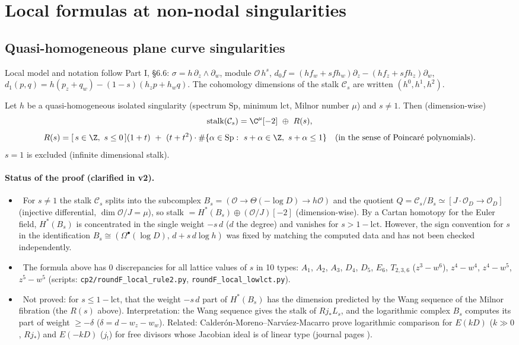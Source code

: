 \section{Local formulas at non-nodal singularities}\label{sec:local2}
\subsection{Quasi-homogeneous plane curve singularities}
Local model and notation follow Part I, \S6.6: $\sigma=h\,\partial_z\wedge\partial_w$, module $\mathcal O\,h^s$, $d_0f=(hf_w+sfh_w)\partial_z-(hf_z+sfh_z)\partial_w$, $d_1(p,q)=h(p_z+q_w)-(1-s)(h_zp+h_wq)$. The cohomology dimensions of the stalk $\mathcal C_s$ are written $(h^0,h^1,h^2)$.

\begin{obs}\label{obs:stalk}
Let $h$ be a quasi-homogeneous isolated singularity (spectrum $\mathrm{Sp}$, minimum $\mathrm{lct}$, Milnor number $\mu$) and $s\ne1$. Then (dimension-wise)
\[\text{stalk}(\mathcal C_s)=\C^{\mu}[-2]\ \oplus\ R(s),\]
\[R(s)=[\,s\in\Z,\ s\le0\,](1+t)\ +\ (t+t^2)\cdot\#\{\alpha\in\mathrm{Sp}:\ s+\alpha\in\Z,\ s+\alpha\le1\}\quad(\text{in the sense of Poincar\'e polynomials}).\]
$s=1$ is excluded (infinite dimensional stalk).
\end{obs}
\paragraph{Status of the proof (clarified in v2).}
\begin{itemize}
\item \tP\ For $s\ne1$ the stalk $\mathcal C_s$ splits into the subcomplex $B_s=(\mathcal O\to\Theta(-\log D)\to h\mathcal O)$ and the quotient $Q=\mathcal C_s/B_s\simeq[J\!\cdot\!\mathcal O_D\to\mathcal O_D]$ (injective differential, $\dim\mathcal O/J=\mu$), so stalk $=H^*(B_s)\oplus(\mathcal O/J)[-2]$ (dimension-wise). By a Cartan homotopy for the Euler field, $H^*(B_s)$ is concentrated in the single weight $-s\,d$ ($d$ the degree) and vanishes for $s>1-\mathrm{lct}$. However, the sign convention for $s$ in the identification $B_s\cong(\Omega^\bullet(\log D),\,d+s\,d\log h)$ was fixed by matching the computed data and has not been checked independently.
\item \tV\ The formula above has 0 discrepancies for all lattice values of $s$ in 10 types: $A_1$, $A_2$, $A_3$, $D_4$, $D_5$, $E_6$, $T_{2,3,6}$ ($z^3-w^6$), $z^4-w^4$, $z^4-w^5$, $z^5-w^5$ (scripts: \texttt{cp2/roundF\_local\_rule2.py}, \texttt{roundF\_local\_lowlct.py}).
\item \tK\ Not proved: for $s\le1-\mathrm{lct}$, that the weight $-s\,d$ part of $H^*(B_s)$ has the dimension predicted by the Wang sequence of the Milnor fibration (the $R(s)$ above). Interpretation: the Wang sequence gives the stalk of $Rj_*L_s$, and the logarithmic complex $B_s$ computes its part of weight $\ge-\delta$ ($\delta=d-w_z-w_w$). Related: Calder\'on-Moreno--Narv\'aez-Macarro \cite{CMNM} prove logarithmic comparison for $E(kD)$ ($k\gg0$, $Rj_*$) and $E(-kD)$ ($j_!$) for free divisors whose Jacobian ideal is of linear type (journal pages \tQ).
\end{itemize}
